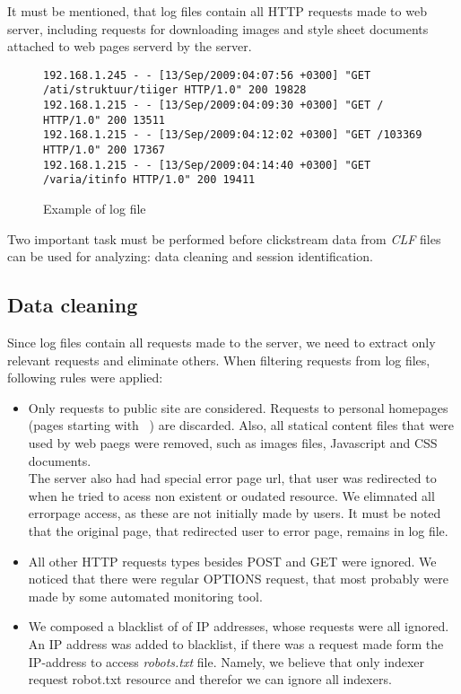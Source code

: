 \documentclass[english,a4paper]{article}
\begin{document}
It must be mentioned, that log files contain all HTTP requests made to web server, including requests for downloading images and style sheet documents attached to web pages serverd by the server.

\begin{figure}[h]
{\tiny
\begin{verbatim}
192.168.1.245 - - [13/Sep/2009:04:07:56 +0300] "GET /ati/struktuur/tiiger HTTP/1.0" 200 19828
192.168.1.215 - - [13/Sep/2009:04:09:30 +0300] "GET / HTTP/1.0" 200 13511
192.168.1.215 - - [13/Sep/2009:04:12:02 +0300] "GET /103369 HTTP/1.0" 200 17367
192.168.1.215 - - [13/Sep/2009:04:14:40 +0300] "GET /varia/itinfo HTTP/1.0" 200 19411
\end{verbatim}
}
\label{log_sample}
\caption{Example of log file}
\end{figure}

Two important task must be performed before clickstream data from \emph{CLF} files can be used for analyzing: data cleaning and session identification.

\subsection{Data cleaning}
Since log files contain all requests made to the server, we need to extract only relevant requests and eliminate others. When filtering requests from log files, following rules were applied:

\begin{itemize}
\item Only requests to public site are considered. Requests to personal homepages (pages starting with ~) are discarded. Also, all statical content files that were used by web paegs were removed, such as images files, Javascript and CSS documents. \\ The server also had had special error page url, that user was redirected to when he tried to acess non existent or oudated resource. We elimnated all errorpage access, as these are not initially made by users. It must be noted that the original page, that redirected user to error page, remains in log file.
  
\item All other HTTP requests types besides POST and GET were ignored. We noticed that there were regular OPTIONS request, that most probably were made by some automated monitoring tool. 
  
\item We composed a blacklist of of IP addresses, whose requests were all ignored. An IP address was added to blacklist, if there was a request made form the IP-address to access \emph{robots.txt} file. Namely, we believe that only indexer request robot.txt resource and therefor we can ignore all indexers.
\end{itemize}
\end{document}
